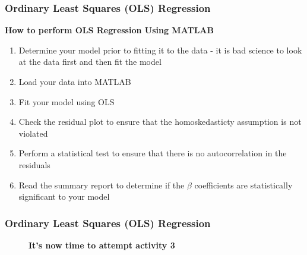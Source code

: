 \documentclass{beamer}
\begin{document}

\begin{frame}
\frametitle{Ordinary Least Squares (OLS) Regression}
\textbf{How to perform OLS Regression Using MATLAB}\\
\vspace{0.3cm}
\begin{tcolorbox}
\begin{enumerate}
\item Determine your model prior to fitting it to the data - it is bad science to look at the data first and then fit the model
\vspace{0.1cm}
\item Load your data into MATLAB
\vspace{0.1cm}
\item Fit your model using OLS
\vspace{0.1cm}
\item Check the residual plot to ensure that the homoskedasticty assumption is not violated
\vspace{0.1cm}
\item Perform a statistical test to ensure that there is no autocorrelation in the residuals
\vspace{0.1cm}
\item Read the summary report to determine if the $\beta$ coefficients are statistically significant to your model
\end{enumerate}
\end{tcolorbox}
\end{frame}


\begin{frame}
\frametitle{Ordinary Least Squares (OLS) Regression}
\begin{figure}
\large\textbf{It's now time to attempt activity 3}
\end{figure}
\end{frame}

\end{document}
